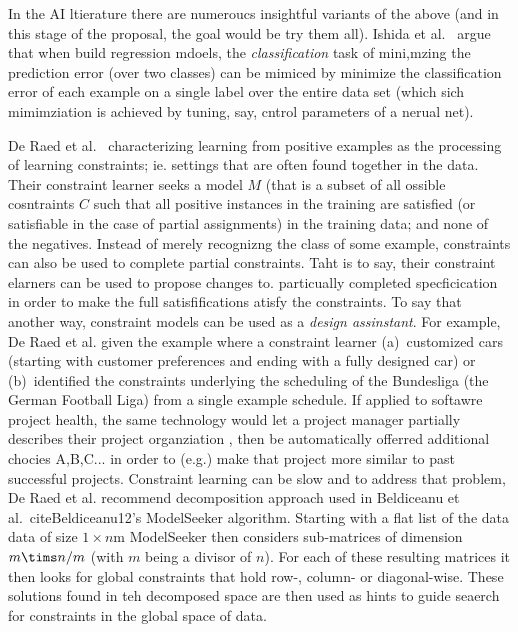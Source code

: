 In the   AI ltierature there are numeroucs insightful variants of the above
(and in this stage of the proposal, the goal would be try them all).
Ishida et al.~\cite{ishida2018binary} argue that when build regression mdoels, 
the {\em classification} task of mini,mzing the prediction error
(over two classes) can be mimiced  by minimize the classification error of each example on a single label over the entire data set (which sich mimimziation is achieved by tuning, say, cntrol parameters of a nerual net).


 De Raed et al.~\cite{de2018learning} characterizing learning from positive examples as the processing of learning constraints; ie. settings that are often found together in the data.
 Their constraint learner seeks a model $M$ (that is a subset of all ossible cosntraints $C$ such that all positive instances in  the training are satisfied (or satisfiable in the case of partial assignments) in the training data; and none of the negatives.
  Instead of merely recognizng the class of some example, constraints can also be used to complete partial constraints. Taht is to say, their constraint elarners can be used to propose changes to. particually completed specficication in order to make the full satisfifications atisfy the constraints. To say that another way, constraint models can be used as a {\em design assinstant}.
 For example,  De Raed et al. given the example where a constraint learner  (a)~customized cars (starting with customer preferences and ending with a fully designed car)  or (b)~identified the constraints underlying the scheduling of the Bundesliga (the German Football Liga) from a single example schedule. If applied to softawre project health, the same technology would let  a project manager partially describes their project organziation , then be automatically offerred   additional chocies A,B,C... in order to (e.g.) make that project more similar to past successful projects. Constraint learning can be slow and to address that problem,
  De Raed et al. recommend decomposition approach used in  Beldiceanu et al.~cite{Beldiceanu12}'s
  ModelSeeker algorithm. Starting with a flat list of the data data of size   $1 \times n$m
  ModelSeeker then considers  sub-matrices of dimension $m \tims  n/m$ (with $m$ being a divisor of $n$). 
  For each of these resulting matrices it then looks for global constraints that hold row-, column- or diagonal-wise. These solutions found in teh decomposed space are then used as hints to guide seaerch for
  constraints in the global space of data.
  
